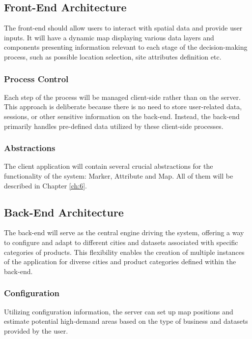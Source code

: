 \subsection{Front-End Architecture}
\label{implementation:front-end}

The front-end should allow users to interact with spatial data and provide user inputs. It will have a dynamic map displaying various data layers and components presenting information relevant to each stage of the decision-making process, such as possible location selection, site attributes definition etc.

\subsubsection{Process Control}
\label{subsec:processControl}

Each step of the process will be managed client-side rather than on the server. This approach is deliberate because there is no need to store user-related data, sessions, or other sensitive information on the back-end. Instead, the back-end primarily handles pre-defined data utilized by these client-side processes.

\subsubsection{Abstractions}

The client application will contain several crucial abstractions for the functionality of the system: Marker, Attribute and Map. All of them will be described in Chapter \ref{ch:6}.

\subsection{Back-End Architecture}

The back-end will serve as the central engine driving the system, offering a way to configure and adapt to different cities and datasets associated with specific categories of products. This flexibility enables the creation of multiple instances of the application for diverse cities and product categories defined within the back-end.

\subsubsection{Configuration}
\label{subsec:configuration}

Utilizing configuration information, the server can set up map positions and estimate potential high-demand areas based on the type of business and datasets provided by the user.

